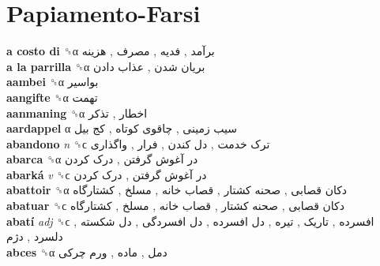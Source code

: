 \twocolumn
\chapter{Papiamento-Farsi}
\small
{}\textbf{a costo di} ␝α   برآمد ,  فدیه ,  مصرف ,  هزینه   \\
\textbf{a la parrilla} ␝α   بریان شدن ,  عذاب دادن   \\
\textbf{aambei} ␝α   بواسیر   \\
\textbf{aangifte} ␝α   تهمت   \\
\textbf{aanmaning} ␝α   اخطار ,  تذکر   \\
\textbf{aardappel} α   سیب زمینی ,  چاقوی کوتاه ,  کج بیل   \\
\textbf{abandono} \emph{n}  ␝ϲ   ترک خدمت ,  دل کندن ,  فرار ,  واگذاری   \\
\textbf{abarca} ␝α   در آغوش گرفتن ,  درک کردن   \\
\textbf{abarká} \emph{v}  ␝ϲ   در آغوش گرفتن ,  درک کردن   \\
\textbf{abattoir} ␝α   دکان قصابی ,  صحنه کشتار ,  قصاب خانه ,  مسلخ ,  کشتارگاه   \\
\textbf{abatuar} ␝ϲ   دکان قصابی ,  صحنه کشتار ,  قصاب خانه ,  مسلخ ,  کشتارگاه   \\
\textbf{abatí} \emph{adj}  ␝ϲ   افسرده ,  تاریک ,  تیره ,  دل افسرده ,  دل افسردگی ,  دل شکسته ,  دلسرد ,  دژم   \\
\textbf{abces} ␝α   دمل ,  ماده ,  ورم چرکی   \\
